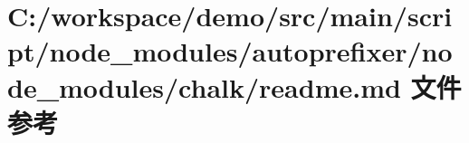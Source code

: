 \hypertarget{node__modules_2autoprefixer_2node__modules_2chalk_2_r_e_a_d_m_e_8md}{}\section{C\+:/workspace/demo/src/main/script/node\+\_\+modules/autoprefixer/node\+\_\+modules/chalk/readme.md 文件参考}
\label{node__modules_2autoprefixer_2node__modules_2chalk_2_r_e_a_d_m_e_8md}

